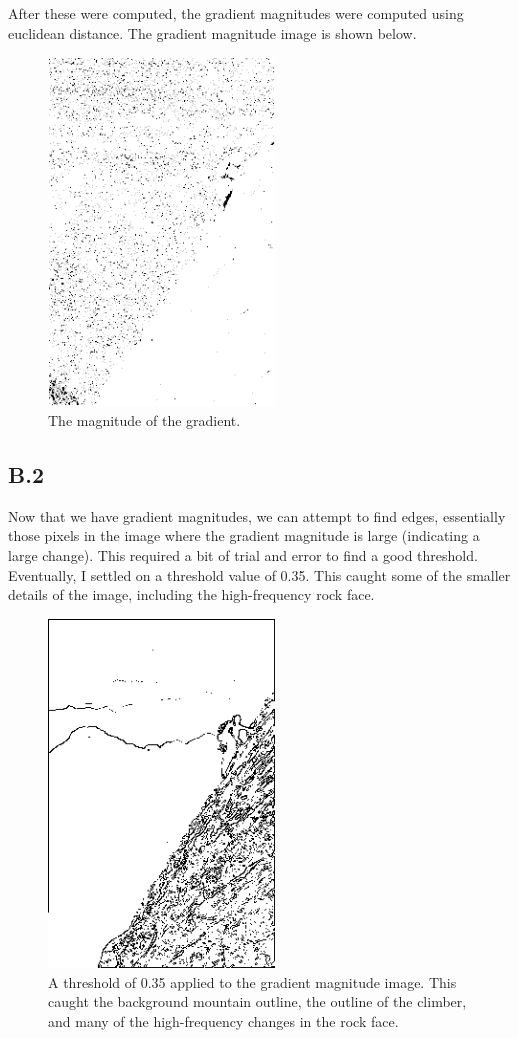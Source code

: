 \documentclass{article}
\begin{document}
After these were computed, the gradient magnitudes were computed using euclidean 
distance. The gradient magnitude image is shown below.

\begin{figure}[!ht]
	\centering
	\includegraphics[width=60mm]{figs/gradient_magnitude.png}
	\caption{The magnitude of the gradient.}
\end{figure}

\subsection{B.2}

Now that we have gradient magnitudes, we can attempt to find edges, essentially 
those pixels in the image where the gradient magnitude is large (indicating a 
large change). This required a bit of trial and error to find a good threshold. 
Eventually, I settled on a threshold value of 0.35. This caught some of the 
smaller details of the image, including the high-frequency rock face.

\begin{figure}[!ht]
	\centering
	\includegraphics[width=60mm]{figs/threshold_response.png}
	\caption{A threshold of 0.35 applied to the gradient magnitude image. This 
        caught the background mountain outline, the outline of the climber, and 
        many of the high-frequency changes in the rock face.}
\end{figure}
\end{document}
